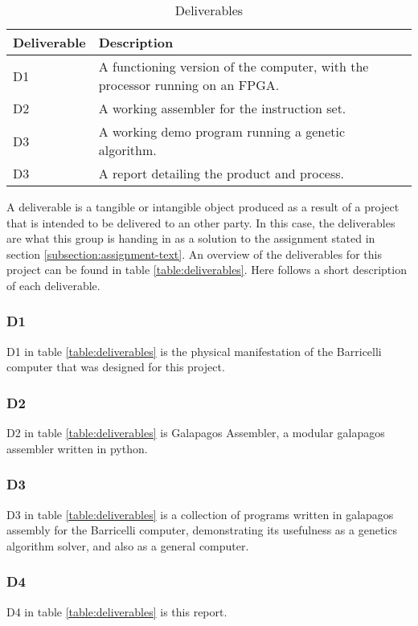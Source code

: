 \begin{table}[H]
 \begin{center}
 \begin{tabular}{| l | p{9cm} |}
 \hline
 Deliverable & Description \\
 \hline
 D1 & A functioning version of the computer, with the processor running on an FPGA.\\
 D2 & A working assembler for the instruction set.\\
 D3 & A working demo program running a genetic algorithm.\\
 D3 & A report detailing the product and process.\\
 \hline
 \end{tabular}
 \caption{Deliverables}
 \label{table:deliverables}
 \end{center}
 \end{table}

A deliverable is a tangible or intangible object produced as a result of a project that is intended to be delivered to an other party.
In this case, the deliverables are what this group is handing in as a solution to the assignment stated in section \vref{subsection:assignment-text}.
An overview of the deliverables for this project can be found in table \vref{table:deliverables}.
Here follows a short description of each deliverable.

\subsubsection{D1}

D1 in table \vref{table:deliverables} is the physical manifestation of the Barricelli computer that was designed for this project.

\subsubsection{D2}

D2 in table \vref{table:deliverables} is Galapagos Assembler, a modular \gls{galapagos} assembler written in python.

\subsubsection{D3}

D3 in table \vref{table:deliverables} is a collection of programs written in galapagos assembly for the Barricelli computer, demonstrating its usefulness as a genetics algorithm solver, and also as a general computer.

\subsubsection{D4}

D4 in table \vref{table:deliverables} is this report.

